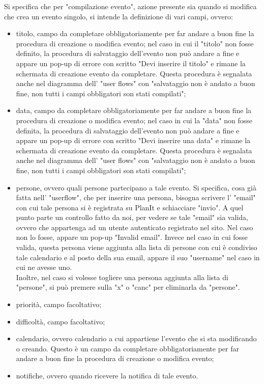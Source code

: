 Si specifica che per "compilazione evento", azione presente sia quando si modifica che crea un evento singolo, si intende la definizione di vari campi, ovvero:
\begin{itemize}
    \item titolo, campo da completare obbligatoriamente per far andare a buon fine la procedura di creazione o modifica evento; nel caso in cui il "titolo" non fosse definito, la procedura di salvataggio dell'evento non può andare a fine e appare un pop-up di errore con scritto "Devi inserire il titolo" e rimane la schermata di creazione evento da completare. Questa procedura è segnalata anche nel diagramma dell' "user flows" con "salvataggio non è andato a buon fine, non tutti i campi obbligatori son stati compilati";
    \item data, campo da completare obbligatoriamente per far andare a buon fine la procedura di creazione o modifica evento; nel caso in cui la "data" non fosse definita, la procedura di salvataggio dell'evento non può andare a fine e appare un pop-up di errore con scritto "Devi inserire una data" e rimane la schermata di creazione evento da completare. Questa procedura è segnalata anche nel diagramma dell' "user flows" con "salvataggio non è andato a buon fine, non tutti i campi obbligatori son stati compilati";
    \item persone, ovvero quali persone partecipano a tale evento. Si specifica, cosa già fatta nell' "userflow", che per inserire una persona, bisogna scrivere l' "email" con cui tale persona si è registrata su PlanIt e schiacciare "invio". A quel punto parte un controllo fatto da noi, per vedere se tale "email" sia valida, ovvero che appartenga ad un utente autenticato registrato nel sito. Nel caso non lo fosse, appare un pop-up "Invalid email". Invece nel caso in cui fosse valida, questa persona viene aggiunta alla lista di persone con cui è condiviso tale calendario e al posto della sua email, appare il suo "username" nel caso in cui ne avesse uno. \\
          Inoltre, nel caso si volesse togliere una persona aggiunta alla lista di "persone", si può premere sulla "x" o "canc" per eliminarla da "persone".
    \item priorità, campo facoltativo;
    \item difficoltà, campo facoltativo;
    \item calendario, ovvero calendario a cui appartiene l'evento che si sta modificando o creando. Questo è un campo da completare obbligatoriamente per far andare a buon fine la procedura di creazione o modifica evento;
    \item notifiche, ovvero quando ricevere la notifica di tale evento.
\end{itemize}
